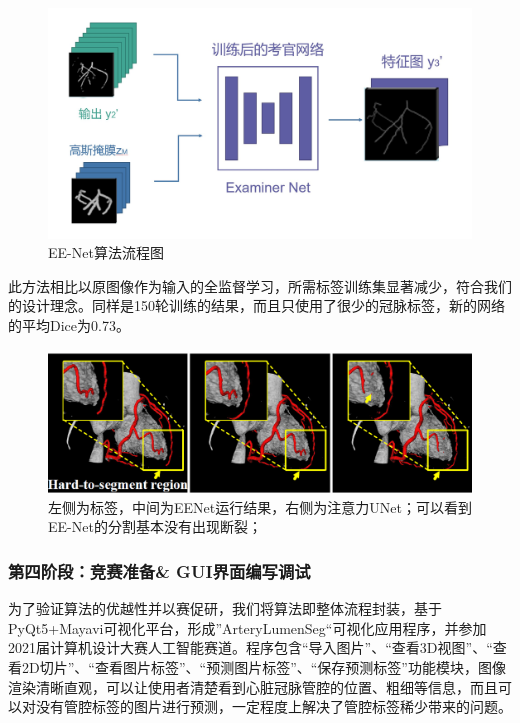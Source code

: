 \documentclass[lang=cn,11pt,a4paper,cite=numbers]{elegantpaper}
\begin{document}
\begin{figure}[H]
    \centering
    \includegraphics[scale=0.5]{./image/前期总结/EENet.jpg}
    \caption{EE-Net算法流程图}
    \label{fig:EENet}
\end{figure}


此方法相比以原图像作为输入的全监督学习，所需标签训练集显著减少，符合我们的设计理念。同样是150轮训练的结果，而且只使用了很少的冠脉标签，新的网络的平均Dice为0.73。

\begin{figure}[H]
    \centering
    \includegraphics[scale=0.5]{./image/前期总结/Result.png}
    \caption{左侧为标签，中间为EENet运行结果，右侧为注意力UNet；可以看到EE-Net的分割基本没有出现断裂；}
    \label{fig:Result}
\end{figure}

\subsubsection{第四阶段：竞赛准备\& GUI界面编写调试}

为了验证算法的优越性并以赛促研，我们将算法即整体流程封装，基于PyQt5+Mayavi可视化平台，形成”ArteryLumenSeg“可视化应用程序，并参加2021届计算机设计大赛人工智能赛道。程序包含“导入图片”、“查看3D视图”、“查看2D切片”、“查看图片标签”、“预测图片标签”、“保存预测标签”功能模块，图像渲染清晰直观，可以让使用者清楚看到心脏冠脉管腔的位置、粗细等信息，而且可以对没有管腔标签的图片进行预测，一定程度上解决了管腔标签稀少带来的问题。
\end{document}
